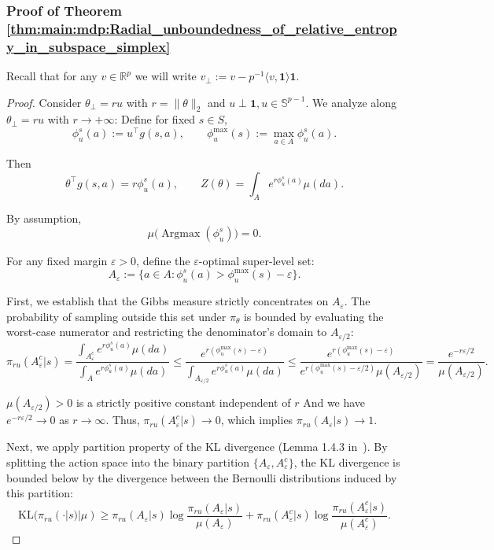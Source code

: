 \documentclass{amsart}
\theoremstyle{definition}
\begin{document}
\subsubsection{Proof of Theorem \ref{thm:main:mdp:Radial_unboundedness_of_relative_entropy_in_subspace_simplex}}
\label{sec:pf_Radial_unboundedness_of_relative_entropy_in_subspace_simplex}

\aspSimplexMaxSet*

Recall that for any $v\in \mathbb R^p$ we will write $v_\perp := v - p^{-1}\langle v, \mathbf 1\rangle \mathbf 1$.

\KLUBSIMPLEX*
\begin{proof}
Consider $\theta_\perp = r u$ with $r = \|\theta\|_2$ and $u \perp \mathbf 1, u \in \mathbb{S}^{p-1}$. 
We analyze along $ \theta_\perp = r u $ with $ r \to +\infty $:
Define for fixed $s \in S$,
\[
\phi^s_u(a) := u^\top g(s,a),
\qquad
\phi_u^{\max}(s) := \max_{a \in A} \phi^s_u(a).
\]

Then
\[
\theta^\top g(s,a) = r \phi^s_u(a),
\qquad
Z(\theta) = \int_{A} e^{r \phi^s_u(a)} \mu(da).
\]

By assumption,
\[
\mu\bigl(\operatorname{Argmax}(\phi^s_u)\bigr) = 0.
\]

For any fixed margin $\varepsilon > 0$, define the $\varepsilon$-optimal super-level set:
\[
A_\varepsilon := \{ a \in A : \phi^s_u(a) > \phi_u^{\max}(s) - \varepsilon \}.
\]

First, we establish that the Gibbs measure strictly concentrates on $A_\varepsilon$. 
The probability of sampling outside this set under $\pi_\theta$ is bounded by evaluating the worst-case numerator and restricting the denominator's domain to $A_{\varepsilon/2}$:
\[
\pi_{ru}(A_\varepsilon^c | s) = \frac{\int_{A_\varepsilon^c} e^{r \phi^s_u(a)} \mu(da)}{\int_A e^{r \phi^s_u(a)} \mu(da)} \le \frac{e^{r(\phi_u^{\max}(s) - \varepsilon)}}{\int_{A_{\varepsilon/2}} e^{r \phi^s_u(a)} \mu(da)} \le \frac{e^{r(\phi_u^{\max}(s) - \varepsilon)}}{e^{r(\phi_u^{\max}(s) - \varepsilon/2)} \mu(A_{\varepsilon/2})} = \frac{e^{-r\varepsilon/2}}{\mu(A_{\varepsilon/2})}.
\]

$\mu(A_{\varepsilon/2}) > 0$ is a strictly positive constant independent of $r$
And we have $e^{-r\varepsilon/2} \to 0$ as $r \to \infty$. Thus, $\pi_{ru}(A_\varepsilon^c | s) \to 0$, which implies $\pi_{ru}(A_\varepsilon | s) \to 1$.

Next, we apply partition property of the KL divergence (Lemma 1.4.3 in~\cite{dupuis2011weak}). 
By splitting the action space into the binary partition $\{A_\varepsilon, A_\varepsilon^c\}$, the KL divergence is bounded below by the divergence between the Bernoulli distributions induced by this partition:
\[
\mathrm{KL}(\pi_{ru}(\cdot |s) | \mu) \ge \pi_{ru}(A_\varepsilon | s) \log \frac{\pi_{ru}(A_\varepsilon | s)}{\mu(A_\varepsilon)} + \pi_{ru}(A_\varepsilon^c | s) \log \frac{\pi_{ru}(A_\varepsilon^c | s)}{\mu(A_\varepsilon^c)}.
\]


\end{proof}
\end{document}
